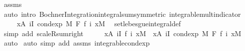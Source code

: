 \begin{isabellebody}
\ assms\ \isamarkupfalse%
\ {\isacharparenleft}{\kern0pt}auto\ intro{\isacharbang}{\kern0pt}{\isacharcolon}{\kern0pt}\ Bochner{\isacharunderscore}{\kern0pt}Integration{\isachardot}{\kern0pt}integral{\isacharunderscore}{\kern0pt}sum{\isacharbrackleft}{\kern0pt}symmetric{\isacharbrackright}{\kern0pt}\ integrable{\isacharunderscore}{\kern0pt}mult{\isacharunderscore}{\kern0pt}indicator{\isacharparenright}{\kern0pt}\isanewline
\ \ \isamarkupfalse%
\ \isamarkupfalse%
\ {\isachardoublequoteopen}{\isachardot}{\kern0pt}{\isachardot}{\kern0pt}{\isachardot}{\kern0pt}\ {\isacharequal}{\kern0pt}\ {\isacharparenleft}{\kern0pt}{\isasymintegral}x{\isasymin}A{\isachardot}{\kern0pt}\ {\isacharparenleft}{\kern0pt}{\isasymSum}i{\isasymin}I{\isachardot}{\kern0pt}\ cond{\isacharunderscore}{\kern0pt}exp\ M\ F\ {\isacharparenleft}{\kern0pt}f\ i{\isacharparenright}{\kern0pt}\ x{\isacharparenright}{\kern0pt}{\isasympartial}M{\isacharparenright}{\kern0pt}{\isachardoublequoteclose}\ \isamarkupfalse%
\ set{\isacharunderscore}{\kern0pt}lebesgue{\isacharunderscore}{\kern0pt}integral{\isacharunderscore}{\kern0pt}def\ \isamarkupfalse%
\ {\isacharparenleft}{\kern0pt}simp\ add{\isacharcolon}{\kern0pt}\ scaleR{\isacharunderscore}{\kern0pt}sum{\isacharunderscore}{\kern0pt}right{\isacharparenright}{\kern0pt}\isanewline
\ \ \isamarkupfalse%
\ \isamarkupfalse%
\ {\isachardoublequoteopen}{\isacharparenleft}{\kern0pt}{\isasymintegral}x{\isasymin}A{\isachardot}{\kern0pt}\ {\isacharparenleft}{\kern0pt}{\isasymSum}i{\isasymin}I{\isachardot}{\kern0pt}\ f\ i\ x{\isacharparenright}{\kern0pt}{\isasympartial}M{\isacharparenright}{\kern0pt}\ {\isacharequal}{\kern0pt}\ {\isacharparenleft}{\kern0pt}{\isasymintegral}x{\isasymin}A{\isachardot}{\kern0pt}\ {\isacharparenleft}{\kern0pt}{\isasymSum}i{\isasymin}I{\isachardot}{\kern0pt}\ cond{\isacharunderscore}{\kern0pt}exp\ M\ F\ {\isacharparenleft}{\kern0pt}f\ i{\isacharparenright}{\kern0pt}\ x{\isacharparenright}{\kern0pt}{\isasympartial}M{\isacharparenright}{\kern0pt}{\isachardoublequoteclose}\ \isamarkupfalse%
\ auto\isanewline
{}\isamarkupfalse%
\ {\isacharparenleft}{\kern0pt}auto\ simp\ add{\isacharcolon}{\kern0pt}\ assms\ integrable{\isacharunderscore}{\kern0pt}cond{\isacharunderscore}{\kern0pt}exp{\isacharparenright}{\kern0pt}%
\endisatagproof
{\isafoldproof}%
%
\isadelimproof
%
\endisadelimproof
%
\isadelimdocument
%
\endisadelimdocument
%
\isatagdocument
%
\isamarkuptrue%

\end{isabellebody}
